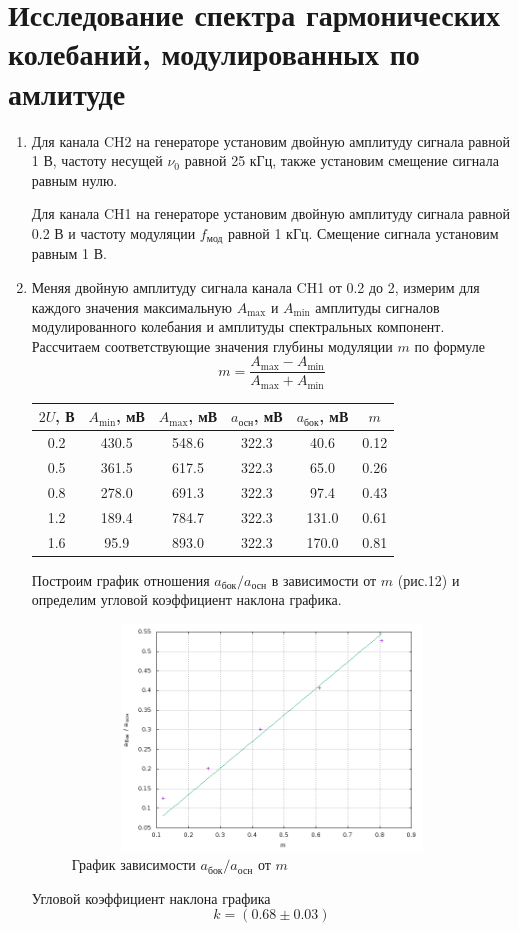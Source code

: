 \documentclass[12pt]{article}
\begin{document}
\section*{Исследование спектра гармонических колебаний, модулированных по амлитуде}
\begin{enumerate}
	\item
	\par
		Для канала CH2 на генераторе установим двойную амплитуду сигнала равной 1 В, частоту несущей $\nu_0$ равной 25 кГц, также установим смещение сигнала равным нулю.
	\par
		Для канала CH1 на генераторе установим двойную амплитуду сигнала равной 0.2 В и частоту модуляции $f_\text{мод}$ равной 1 кГц. Смещение сигнала установим равным 1 В.
	\item
		Меняя двойную амплитуду сигнала канала CH1 от 0.2 до 2, измерим для каждого значения максимальную $A_\text{max}$ и $A_\text{min}$ амплитуды сигналов модулированного колебания и амплитуды спектральных компонент. Рассчитаем соответствующие значения глубины модуляции $m$ по формуле
		\[
			m = \frac{A_\text{max} - A_\text{min}}{A_\text{max} + A_\text{min}}
		\]
		\begin{table}[h!]
			\centering
			\begin{tabular}{|c|c|c|c|c|c|}
			\hline
				$2U$, В & $A_\text{min}$, мВ & $A_\text{max}$, мВ & $a_\text{осн}$, мВ & $a_\text{бок}$, мВ & $m$\\
			\hline
				0.2	& 430.5	& 548.6	& 322.3	& 40.6 & 0.12 \\
			\hline
				0.5	& 361.5	& 617.5	& 322.3	& 65.0 & 0.26 \\
			\hline
				0.8	& 278.0 & 691.3 & 322.3 & 97.4 & 0.43 \\
			\hline
				1.2	& 189.4 & 784.7 & 322.3 & 131.0 & 0.61 \\
			\hline
				1.6	& 95.9  & 893.0	& 322.3	& 170.0 & 0.81 \\
			\hline
			\end{tabular}
		\end{table}
	\par
		Построим график отношения $a_\text{бок} / a_\text{осн}$ в зависимости от $m$ (рис.12) и определим угловой коэффициент наклона графика.
		\newpage
		\begin{figure}[h!]
			\centering
			\includegraphics[width = 12cm, height = 6cm]{plot3.png}
			\caption{График зависимости $a_\text{бок} / a_\text{осн}$ от $m$}
		\end{figure}
		\par
		Угловой коэффициент наклона графика
		\[
			k = \left(0.68 \pm 0.03\right)
		\]
\end{enumerate}
\end{document}
